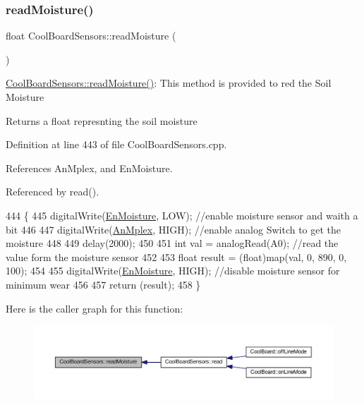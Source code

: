 \subsubsection{\texorpdfstring{read\+Moisture()}{readMoisture()}}
{\footnotesize\ttfamily float Cool\+Board\+Sensors\+::read\+Moisture (\begin{DoxyParamCaption}{ }\end{DoxyParamCaption})}

\hyperlink{classCoolBoardSensors_a8761bff50373c485f4465c8db47d0633}{Cool\+Board\+Sensors\+::read\+Moisture()}\+: This method is provided to red the Soil Moisture

\begin{DoxyReturn}{Returns}
a float represnting the soil moisture 
\end{DoxyReturn}


Definition at line 443 of file Cool\+Board\+Sensors.\+cpp.



References An\+Mplex, and En\+Moisture.



Referenced by read().


\begin{DoxyCode}
444 \{
445       digitalWrite(\hyperlink{classCoolBoardSensors_a6177d02e14a057a2f171a2e930b5038d}{EnMoisture}, LOW);                 \textcolor{comment}{//enable moisture sensor and waith a bit}
446       
447       digitalWrite(\hyperlink{classCoolBoardSensors_a12ef28b1046219e0aee10bf64e28c4a5}{AnMplex}, HIGH);           \textcolor{comment}{//enable analog Switch to get the moisture}
448       
449       delay(2000);
450       
451       \textcolor{keywordtype}{int} val = analogRead(A0);                       \textcolor{comment}{//read the value form the moisture sensor}
452       
453       \textcolor{keywordtype}{float} result = (float)map(val, 0, 890, 0, 100);   
454 
455       digitalWrite(\hyperlink{classCoolBoardSensors_a6177d02e14a057a2f171a2e930b5038d}{EnMoisture}, HIGH);                  \textcolor{comment}{//disable moisture sensor for minimum wear}
456       
457       \textcolor{keywordflow}{return} (result);
458 \}
\end{DoxyCode}
Here is the caller graph for this function\+:
\nopagebreak
\begin{figure}[H]
\begin{center}
\leavevmode
\includegraphics[width=350pt]{classCoolBoardSensors_a8761bff50373c485f4465c8db47d0633_icgraph}
\end{center}
\end{figure}
\mbox{\label{classCoolBoardSensors_a6944b6ea7bce8e2fce1b434acfd9d5f3}} 
